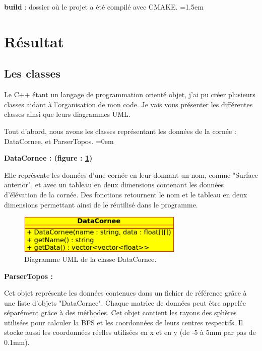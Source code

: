 \documentclass[a4paper,12pt]{article}
\begin{document}
\textbf{build} : dossier où le projet a été compilé avec CMAKE.
\parindent=1.5em






\newpage
\section{Résultat}
	\subsection{Les classes}
Le C++ étant un langage de programmation orienté objet, j'ai pu créer plusieurs classes aidant à l'organisation de mon code. Je vais vous présenter les différentes classes ainsi que leurs diagrammes UML.  

\vspace{0.25cm}
Tout d'abord, nous avons les classes représentant les données de la cornée : DataCornee, et ParserTopos.
\parindent=0em

\vspace{0.25cm}
\textbf{DataCornee : (figure : \ref{DataCornee})}

Elle représente les données d'une cornée en leur donnant un nom, comme "Surface anterior", et avec un tableau en deux dimensions contenant les données d'élévation de la cornée. Des fonctions retournent le nom et le tableau en deux dimensions permettant ainsi de le réutilisé dans le programme.

\begin{figure}[h]
\centering
	\includegraphics[width=8cm]{DataCornee.png} 
	\caption{Diagramme UML de la classe DataCornee.}
	\label{DataCornee}
\end{figure}

\textbf{ParserTopos : }

Cet objet représente les données contenues dans un fichier de référence grâce à une liste d'objets "DataCornee". Chaque matrice de données peut être appelée séparément grâce à des méthodes. Cet objet contient les rayons des sphères utilisées pour calculer la BFS et les coordonnées de leurs centres respectifs. Il stocke aussi les coordonnées réelles utilisées en x et en y (de -5 à 5mm par pas de 0.1mm). 
\end{document}
